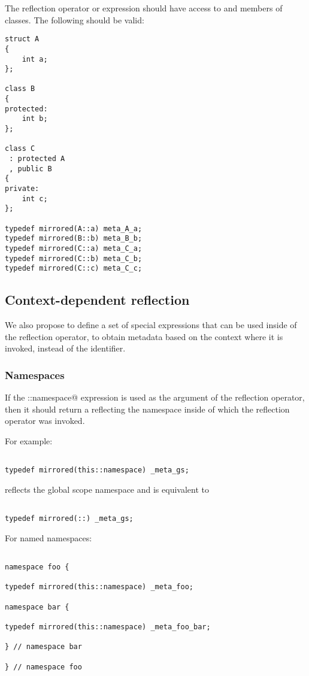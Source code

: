 The reflection operator or expression should have access to \verb@private@ and
\verb@protected@ members of classes. The following should be valid:

\begin{verbatim}
struct A
{
	int a;
};

class B
{
protected:
	int b;
};

class C
 : protected A
 , public B
{
private:
	int c;
};

typedef mirrored(A::a) meta_A_a;
typedef mirrored(B::b) meta_B_b;
typedef mirrored(C::a) meta_C_a;
typedef mirrored(C::b) meta_C_b;
typedef mirrored(C::c) meta_C_c;

\end{verbatim}

\subsection{Context-dependent reflection}

We also propose to define a set of special expressions that can be used
inside of the reflection operator, to obtain metadata based on the context
where it is invoked, instead of the identifier.

\subsubsection{Namespaces}

If the \verb@this::namespace@ expression is used as the argument of the reflection
operator, then it should return a  reflecting the namespace
inside of which the reflection operator was invoked.

For example:

\begin{verbatim}

typedef mirrored(this::namespace) _meta_gs;

\end{verbatim}

reflects the global scope namespace and is equivalent to

\begin{verbatim}

typedef mirrored(::) _meta_gs;

\end{verbatim}

For named namespaces:

\begin{verbatim}

namespace foo {

typedef mirrored(this::namespace) _meta_foo;

namespace bar {

typedef mirrored(this::namespace) _meta_foo_bar;

} // namespace bar

} // namespace foo
\end{verbatim}


